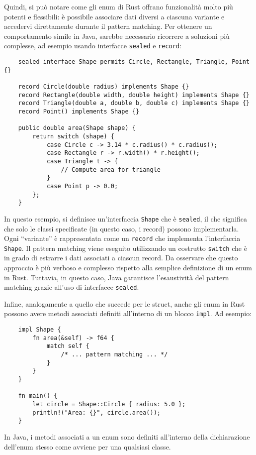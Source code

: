 Quindi, si può notare come gli enum di Rust offrano funzionalità molto più potenti e flessibili: è possibile associare dati diversi a ciascuna variante e accedervi direttamente durante il pattern matching. Per ottenere un comportamento simile in Java, sarebbe necessario ricorrere a soluzioni più complesse, ad esempio usando interfacce \texttt{sealed} e \texttt{record}:
\begin{verbatim}
    sealed interface Shape permits Circle, Rectangle, Triangle, Point {}

    record Circle(double radius) implements Shape {}
    record Rectangle(double width, double height) implements Shape {}
    record Triangle(double a, double b, double c) implements Shape {}
    record Point() implements Shape {}

    public double area(Shape shape) {
        return switch (shape) {
            case Circle c -> 3.14 * c.radius() * c.radius();
            case Rectangle r -> r.width() * r.height();
            case Triangle t -> {
                // Compute area for triangle
            }
            case Point p -> 0.0;
        };
    }
\end{verbatim}
In questo esempio, si definisce un'interfaccia \texttt{Shape} che è \texttt{sealed}, il che significa che solo le classi specificate (in questo caso, i record) possono implementarla. Ogni ``variante'' è rappresentata come un \texttt{record} che implementa l'interfaccia \texttt{Shape}. Il pattern matching viene eseguito utilizzando un costrutto \texttt{switch} che è in grado di estrarre i dati associati a ciascun record. Da osservare che questo approccio è più verboso e complesso rispetto alla semplice definizione di un enum in Rust. Tuttavia, in questo caso, Java garantisce l'esaustività del pattern matching grazie all'uso di interfacce \texttt{sealed}.

Infine, analogamente a quello che succede per le struct, anche gli enum in Rust possono avere metodi associati definiti all'interno di un blocco \texttt{impl}. Ad esempio:
\begin{verbatim}
    impl Shape {
        fn area(&self) -> f64 {
            match self {
                /* ... pattern matching ... */
            }
        }
    }

    fn main() {
        let circle = Shape::Circle { radius: 5.0 };
        println!("Area: {}", circle.area());
    }
\end{verbatim}
In Java, i metodi associati a un enum sono definiti all'interno della dichiarazione dell'enum stesso come avviene per una qualsiasi classe.